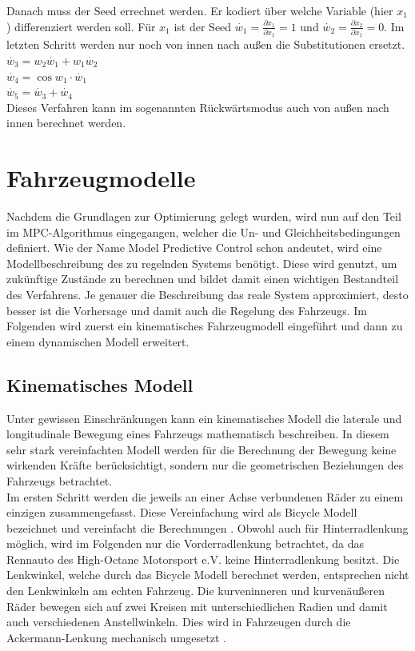 \documentclass{like}
\begin{document}
Danach muss der Seed errechnet werden. Er kodiert über welche Variable (hier $x_1$) differenziert werden soll. Für $x_1$ ist der Seed $\dot{w_1} = \frac{\partial x_1}{\partial x_1} = 1$ und   $\dot{w_2} = \frac{\partial x_2}{\partial x_1} = 0$.
Im letzten Schritt werden nur noch von innen nach außen die Substitutionen ersetzt. \\
$\dot{w_3} = w_2\dot{w_1} + w_1 \dot{w_2}$ \\
$\dot{w_4} = \cos{w_1} \cdot \dot{w_1}$ \\
$\dot{w_5} = \dot{w_3} + \dot{w_4}$ \\
Dieses Verfahren kann im sogenannten Rückwärtsmodus auch von außen nach innen berechnet werden.  

\newpage
\section{Fahrzeugmodelle}
Nachdem die Grundlagen zur Optimierung gelegt wurden, wird nun auf den Teil im \ac{MPC}-Algorithmus eingegangen, welcher die Un- und Gleichheitsbedingungen definiert.
Wie der Name Model Predictive Control schon andeutet, wird eine Modellbeschreibung des zu regelnden Systems benötigt. Diese wird genutzt, um zukünftige Zustände zu berechnen und bildet damit einen wichtigen Bestandteil des Verfahrens. Je genauer die Beschreibung das reale System approximiert, desto besser ist die Vorhersage und damit auch die Regelung des Fahrzeugs.
Im Folgenden wird zuerst ein kinematisches Fahrzeugmodell eingeführt und dann zu einem dynamischen Modell erweitert.   

\subsection{Kinematisches Modell}
\label{kinematicModel}
Unter gewissen Einschränkungen kann ein kinematisches Modell die laterale und longitudinale Bewegung eines Fahrzeugs mathematisch beschreiben. In diesem sehr stark vereinfachten Modell werden für die Berechnung der Bewegung keine wirkenden Kräfte berücksichtigt, sondern nur die geometrischen Beziehungen des Fahrzeugs betrachtet. \\
Im ersten Schritt werden die jeweils an einer Achse verbundenen Räder zu einem einzigen zusammengefasst. Diese Vereinfachung wird als Bicycle Modell bezeichnet und vereinfacht die Berechnungen \cite{BicycleModel}. Obwohl auch für Hinterradlenkung möglich, wird im Folgenden nur die Vorderradlenkung betrachtet, da das Rennauto des High-Octane Motorsport e.V. keine Hinterradlenkung besitzt. Die Lenkwinkel, welche durch das Bicycle Modell berechnet werden, entsprechen nicht den Lenkwinkeln am echten Fahrzeug. Die kurveninneren und kurvenäußeren Räder bewegen sich auf zwei Kreisen mit unterschiedlichen Radien und damit auch verschiedenen Anstellwinkeln. Dies wird in Fahrzeugen durch die Ackermann-Lenkung mechanisch umgesetzt \cite{rajamani2011vehicle}.
\end{document}
